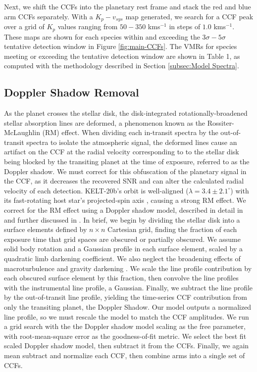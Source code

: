 \documentclass[twocolumn]{aastex631}
\begin{document}
        Next, we shift the CCFs into the planetary rest frame and stack the red and blue arm CCFs separately. With a ${K_p-v_{sys}}$ map generated, we search for a CCF peak over a grid of $K_p$ values ranging from $50-350$ kms$^{-1}$ in steps of $1.0$ kms$^{-1}$. These maps are shown for each species within and exceeding the ${3\sigma}-{5\sigma}$ tentative detection window in Figure \ref{fig:main-CCFs}. The VMRs for species meeting or exceeding the tentative detection window are shown in Table 1, as computed with the methodology described in Section \ref{subsec:Model Spectra}.

    \subsection{Doppler Shadow Removal}
        As the planet crosses the stellar disk, the disk-integrated rotationally-broadened stellar absorption lines are deformed, a phenomenon known as the Rossiter-McLaughlin (RM) effect. When dividing each in-transit spectra by the out-of-transit spectra to isolate the atmospheric signal, the deformed lines cause an artifact on the CCF at the radial velocity corresponding to to the stellar disk being blocked by the transiting planet at the time of exposure, referred to as the Doppler shadow. We must correct for this obfuscation of the planetary signal in the CCF, as it decreases the recovered SNR and can alter the calculated radial velocity of each detection. KELT-20b's orbit is well-aligned ($\lambda = 3.4 \pm 2.1 ^{\circ}$) with its fast-rotating host star's projected-spin axis \citep{Lund2017}, causing a strong RM effect. We correct for the RM effect using a Doppler shadow model, described in detail in \citep{Johnson2016} and further discussed in \citep{Johnson2014, Johnson2017}. In brief, we begin by dividing the stellar disk into a surface elements defined by $n \times n$ Cartesian grid, finding the fraction of each exposure time that grid spaces are obscured or partially obscured. We assume solid body rotation and a Gaussian profile in each surface element, scaled by a quadratic limb darkening coefficient. We also neglect the broadening effects of macroturbulence and gravity darkening \cite{Johnson2016}. We scale the line profile contribution by each obscured surface element by this fraction, then convolve the line profiles with the instrumental line profile, a Gaussian. Finally, we subtract the line profile by the out-of-transit line profile, yielding the time-series CCF contribution from only the transiting planet, the Doppler Shadow. Our model outputs a normalized line profile, so we must rescale the model to match the CCF amplitudes. We run a grid search with the the Doppler shadow model scaling as the free parameter, with root-mean-square error as the goodness-of-fit metric. We select the best fit scaled Doppler shadow model, then subtract it from the CCFs. Finally, we again mean subtract and normalize each CCF, then combine arms into a single set of CCFs.
        
\end{document}

